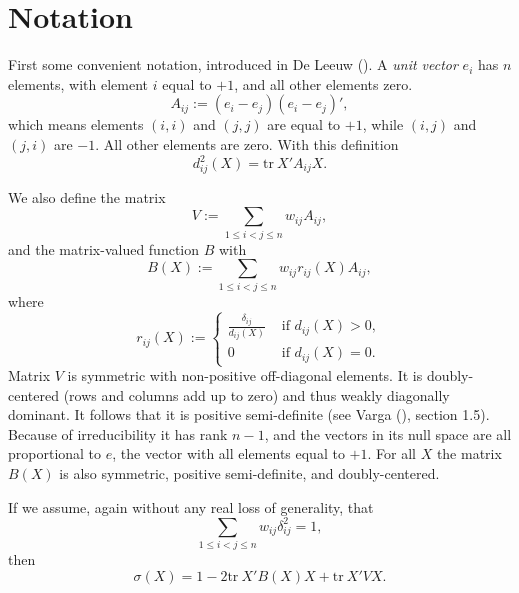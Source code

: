 \documentclass[
  12pt,
  letterpaper,
  DIV=11,
  numbers=noendperiod]{scrartcl}
\newcommand{\sectionbreak}{\clearpage}
\begin{document}
\sectionbreak

\section{Notation}\label{notation}

First some convenient notation, introduced in De Leeuw
(). A \emph{unit vector} \(e_i\) has
\(n\) elements, with element \(i\) equal to \(+1\), and all other
elements zero. \begin{equation}
  A_{ij}:=(e_i-e_j)(e_i-e_j)',\label{eq-adef}
\end{equation} which means elements \((i,i)\) and \((j,j)\) are equal to
\(+1\), while \((i,j)\) and \((j,i)\) are \(-1\). All other elements are
zero. With this definition \begin{equation}
d_{ij}^2(X)=\text{tr}\ X'A_{ij}X.
\label{eq-anot}
\end{equation}

We also define the matrix \begin{equation}
V:=\mathop{\sum}_{1\leq i<j\leq n}w_{ij}A_{ij},
\label{eq-vdef}
\end{equation} and the matrix-valued function \(B\) with
\begin{equation}
B(X):=\mathop{\sum}_{1\leq i<j\leq n}w_{ij}r_{ij}(X)A_{ij},
\label{eq-bdef}
\end{equation} where \begin{equation}
r_{ij}(X):=\begin{cases}\frac{\delta_{ij}}{d_{ij}(X)}&\text{ if }d_{ij}(X)>0,\\
0&\text{ if }d_{ij}(X)=0.\end{cases}\label{eq-rdef}
\end{equation} Matrix \(V\) is symmetric with non-positive off-diagonal
elements. It is doubly-centered (rows and columns add up to zero) and
thus weakly diagonally dominant. It follows that it is positive
semi-definite (see Varga (), section 1.5).
Because of irreducibility it has rank \(n-1\), and the vectors in its
null space are all proportional to \(e\), the vector with all elements
equal to \(+1\). For all \(X\) the matrix \(B(X)\) is also symmetric,
positive semi-definite, and doubly-centered.

If we assume, again without any real loss of generality, that
\begin{equation}
\mathop{\sum}_{1\leq i<j\leq n}w_{ij}\delta_{ij}^2=1,
\label{eq-dnorm}
\end{equation} then \begin{equation}
\sigma(X)=1-2\text{tr}\ X'B(X)X+\text{tr}\ X'VX.
\label{eq-S}
\end{equation}
\end{document}
